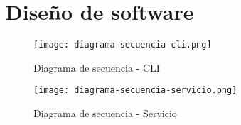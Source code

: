 \section{Diseño de software} \label{sec:dis}

    \begin{figure}[h!]
    \centering
        \texttt{[image: diagrama-secuencia-cli.png]}
        \caption{Diagrama de secuencia - CLI}
        \label{fig:sequence-cli}
    \end{figure}
    
    \begin{figure}[h!]
    \centering
        \texttt{[image: diagrama-secuencia-servicio.png]}
        \caption{Diagrama de secuencia - Servicio}
        \label{fig:sequence-service}
    \end{figure}